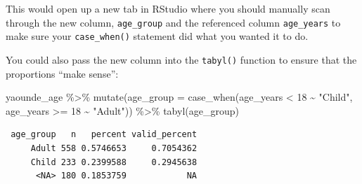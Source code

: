 \documentclass[
  letterpaper,
  DIV=11,
  numbers=noendperiod]{scrreprt}
\newenvironment{Shaded}{\begin{snugshade}}{\end{snugshade}}
\newcommand{\AttributeTok}[1]{\textcolor[rgb]{0.40,0.45,0.13}{#1}}
\newcommand{\DecValTok}[1]{\textcolor[rgb]{0.68,0.00,0.00}{#1}}
\newcommand{\FunctionTok}[1]{\textcolor[rgb]{0.28,0.35,0.67}{#1}}
\newcommand{\NormalTok}[1]{\textcolor[rgb]{0.00,0.23,0.31}{#1}}
\newcommand{\SpecialCharTok}[1]{\textcolor[rgb]{0.37,0.37,0.37}{#1}}
\newcommand{\StringTok}[1]{\textcolor[rgb]{0.13,0.47,0.30}{#1}}
\begin{document}
This would open up a new tab in RStudio where you should manually scan
through the new column, \texttt{age\_group} and the referenced column
\texttt{age\_years} to make sure your \texttt{case\_when()} statement
did what you wanted it to do.

You could also pass the new column into the \texttt{tabyl()} function to
ensure that the proportions ``make sense'':

\begin{Shaded}
\begin{Highlighting}[]
\NormalTok{yaounde\_age }\SpecialCharTok{\%\textgreater{}\%}  
  \FunctionTok{mutate}\NormalTok{(}\AttributeTok{age\_group =} \FunctionTok{case\_when}\NormalTok{(age\_years }\SpecialCharTok{\textless{}} \DecValTok{18} \SpecialCharTok{\textasciitilde{}} \StringTok{"Child"}\NormalTok{, }
\NormalTok{                               age\_years }\SpecialCharTok{\textgreater{}=} \DecValTok{18} \SpecialCharTok{\textasciitilde{}} \StringTok{"Adult"}\NormalTok{)) }\SpecialCharTok{\%\textgreater{}\%} 
  \FunctionTok{tabyl}\NormalTok{(age\_group)}
\end{Highlighting}
\end{Shaded}

\begin{verbatim}
 age_group   n   percent valid_percent
     Adult 558 0.5746653     0.7054362
     Child 233 0.2399588     0.2945638
      <NA> 180 0.1853759            NA
\end{verbatim}
\end{document}

